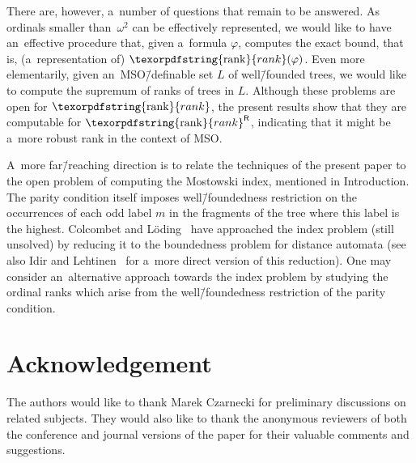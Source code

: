 \documentclass[11pt,a4paper]{amsart}
\theoremstyle{plain}
\theoremstyle{definition}
\theoremstyle{defC}
\theoremstyle{thmC}
\theoremstyle{plain}
\numberwithin{equation}{section}
\numberwithin{equation}{section}
\numberwithin{figure}{section}
\newcommand{\ident}[1]{\ensuremath{\texorpdfstring{\mathrm{\mathnm{#1}}}{#1}}\xspace}
\newcommand{\mathnm}[1]{#1}
\newcommand{\sR}{\mathsf{R}}
\newcommand{\rank}{\ident{rank}}
\newcommand{\rankR}{\ident{rank}^\sR}
\begin{document}
There are, however, a~number of questions that remain to be answered.
As ordinals smaller than~$\omega^2$ can be effectively represented, we would like to have an~effective procedure that, given a~formula $\varphi$, computes the exact bound,
that is, (a~representation of) $\rank(\varphi)$.
Even more elementarily, given an~MSO\=/definable set $L$ of
well\=/founded trees, we would like to compute the supremum of ranks of trees in $L$. Although these problems are open for $\rank$, the present results show that they are computable for $\rankR$, indicating that it might be a~more robust rank in the context of MSO.

A~more far\=/reaching direction is to relate the techniques of the present paper to the open problem of computing the Mostowski index, mentioned in Introduction.
The parity condition itself imposes well\=/foundedness restriction on the occurrences of each odd label $m$ in the fragments of the tree where this label is the highest.
Colcombet and Löding~\cite{loding_index_to_bounds} have approached the index problem (still unsolved) by reducing it to the boundedness problem for distance automata
(see also Idir and Lehtinen~\cite{lehtinen_mostowski} for a~more direct version of this reduction).
One may consider an~alternative approach towards the index problem by studying the ordinal ranks which arise from the well\=/foundedness restriction of the parity condition.


\section*{Acknowledgement}\noindent
The authors would like to thank Marek Czarnecki for preliminary discussions on related subjects.
They would also like to thank the anonymous reviewers of both the conference and journal versions of the paper for their valuable comments and suggestions.
\end{document}
